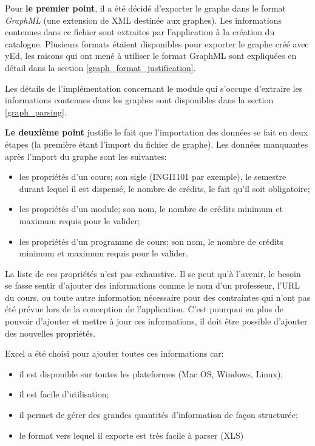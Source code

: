 Pour \textbf{le premier point}, il a été décidé d'exporter le graphe dans le format \textit{GraphML} (une extension de XML destinée aux graphes). Les informations contenues dans ce fichier sont extraites par l'application à la création du catalogue. Plusieurs formats étaient disponibles pour exporter le graphe créé avec yEd, les raisons qui ont mené à utiliser le format GraphML sont expliquées en détail dans la section \ref{graph_format_justification}.

Les détails de l'implémentation concernant le module qui s'occupe d'extraire les informations contenues dans les graphes sont disponibles dans la section \ref{graph_parsing}.

\textbf{Le deuxième point} justifie le fait que l'importation des données se fait en deux étapes (la première étant l'import du fichier de graphe). Les données manquantes après l'import du graphe sont les suivantes:

\begin{itemize}
  \item les propriétés d'un cours; son sigle (INGI1101 par exemple), le semestre durant lequel il est dispensé, le nombre de crédits, le fait qu'il soit obligatoire;
  \item les propriétés d'un module; son nom, le nombre de crédits minimum et maximum requis pour le valider;
  \item les propriétés d'un programme de cours; son nom, le nombre de crédits minimum et maximum requis pour le valider.
\end{itemize}

La liste de ces propriétés n'est pas exhaustive. Il se peut qu'à l'avenir, le besoin se fasse sentir d'ajouter des informations comme le nom d'un professeur, l'URL du cours, ou toute autre information nécessaire pour des contraintes qui n'ont pas été prévue lors de la conception de l'application. C'est pourquoi en plus de pouvoir d'ajouter et mettre à jour ces informations, il doit être possible d'ajouter des nouvelles propriétés.

Excel a été choisi pour ajouter toutes ces informations car:
\begin{itemize}
  \item il est disponible sur toutes les plateformes (Mac OS, Windows, Linux);
  \item il est facile d'utilisation;
  \item il permet de gérer des grandes quantités d'information de façon structurée;
  \item le format vers lequel il exporte est très facile à parser (XLS)
\end{itemize}

